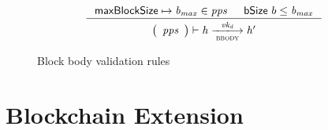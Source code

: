 \documentclass[11pt,a4paper]{article}
\newcommand{\var}[1]{\mathit{#1}}
\newcommand{\fun}[1]{\mathsf{#1}}
\newcommand{\type}[1]{\mathsf{#1}}
\newcommand{\trans}[2]{\xlongrightarrow[\textsc{#1}]{#2}}
\newcommand{\bsizename}{bSize}
\newcommand{\bsize}[1]{\fun{\bsizename} ~ #1}
\begin{document}
\begin{figure}[ht]
  \begin{equation*}
    \inference
    { \maxblocksize \mapsto \var{b_{max}} \in \var{pps} && \bsize{b} \leq \var{b_{max}} \\
    }
    {
      \left(
        {\begin{array}{c}
          \var{pps} \\
        \end{array}}
      \right)
      \vdash
        {\var{h}}
      \trans{bbody}{\var{vk_d}}
        {\var{h'}}
    }
  \end{equation*}
  \caption{Block body validation rules}
  \label{fig:rules:bbody}
\end{figure}

\clearpage

\section{Blockchain Extension}
\label{sec:chain-extension}

\newcommand{\CEEnv}{\type{CEEnv}}
\newcommand{\CEState}{\type{CEState}}

\newcommand{\butxo}[1]{\fun{bUtxo}\ #1}
\newcommand{\bupdprop}[1]{\fun{bUpdProp}\ #1}
\newcommand{\bupdvotes}[1]{\fun{bUpdVotes}\ #1}
\newcommand{\bprotver}[1]{\fun{bProtVer}\ #1}
\newcommand{\bendorsment}[1]{\fun{bEndorsment}\ #1}

\newcommand{\UTxO}{\type{UTxO}}
\newcommand{\DIEnv}{\type{DIEnv}}
\newcommand{\DIState}{\type{DIState}}

\newcommand{\UPIEnv}{\type{UPIEnv}}
\newcommand{\UProp}{\type{UProp}}
\newcommand{\Vote}{\ensuremath{\type{Vote}}}
\newcommand{\ProtVer}{\ensuremath{\type{ProtVer}}}
\end{document}
